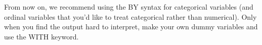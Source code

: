 \documentclass[]{report}\usepackage[]{graphicx}\usepackage[]{color}
\begin{document}
From now on, we recommend using the BY syntax for categorical variables (and ordinal variables that you'd like to treat categorical rather than numerical). Only when you find the output hard to interpret, make your own dummy variables and use the WITH keyword.





\end{document}

